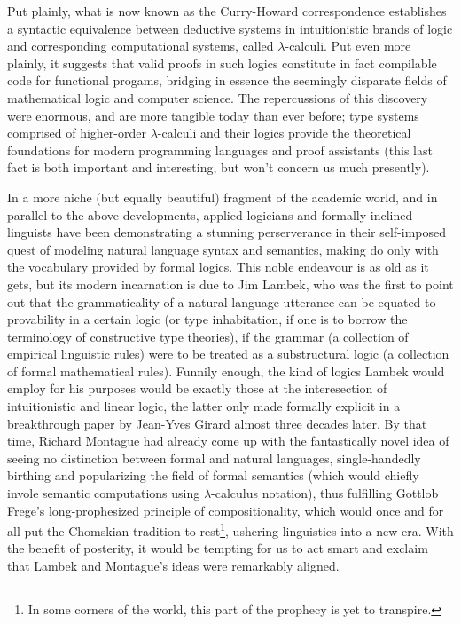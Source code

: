 Put plainly, what is now known as the Curry-Howard correspondence establishes a syntactic equivalence between deductive systems in intuitionistic brands of logic and corresponding computational systems, called $\lambda$-calculi.
Put even more plainly, it suggests that valid proofs in such logics constitute in fact compilable code for functional progams, bridging in essence the seemingly disparate fields of mathematical logic and computer science.
The repercussions of this discovery were enormous, and are more tangible today than ever before; type systems comprised of higher-order $\lambda$-calculi and their logics provide the theoretical foundations for modern programming languages and proof assistants (this last fact is both important and interesting, but won't concern us much presently).

In a more niche (but equally beautiful) fragment of the academic world, and in parallel to the above developments, applied logicians and formally inclined linguists have been demonstrating a stunning perserverance in their self-imposed quest of modeling natural language syntax and semantics, making do only with the vocabulary provided by formal logics.
This noble endeavour is as old as it gets, but its modern incarnation is due to Jim Lambek, who was the first to point out that the grammaticality of a natural language utterance can be equated to provability in a certain logic (or type inhabitation, if one is to borrow the terminology of constructive type theories), if the grammar (a collection of empirical linguistic rules) were to be treated as a substructural logic (a collection of formal mathematical rules).
Funnily enough, the kind of logics Lambek would employ for his purposes would be exactly those at the interesection of intuitionistic and linear logic, the latter only made formally explicit in a breakthrough paper by Jean-Yves Girard almost three decades later.
By that time, Richard Montague had already come up with the fantastically novel idea of seeing no distinction between formal and natural languages, single-handedly birthing and popularizing the field of formal semantics (which would chiefly invole semantic computations using $\lambda$-calculus notation), thus fulfilling Gottlob Frege's long-prophesized principle of compositionality, which would once and for all put the Chomskian tradition to rest\footnote{In some corners of the world, this part of the prophecy is yet to transpire.}, ushering linguistics into a new era.
With the benefit of posterity, it would be tempting for us to act smart and exclaim that Lambek and Montague's ideas were remarkably aligned. 
